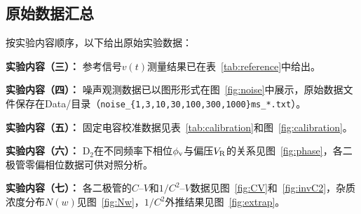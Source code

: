 \subsection{原始数据汇总}

按实验内容顺序，以下给出原始实验数据：

\textbf{实验内容（三）：} 参考信号$v(t)$测量结果已在表~\ref{tab:reference}中给出。

\textbf{实验内容（四）：} 噪声观测数据已以图形形式在图~\ref{fig:noise}中展示，原始数据文件保存在Data/目录（\texttt{noise\_\{1,3,10,30,100,300,1000\}ms\_*.txt}）。

\textbf{实验内容（五）：} 固定电容校准数据见表~\ref{tab:calibration}和图~\ref{fig:calibration}。

\textbf{实验内容（六）：} D$_2$在不同频率下相位$\phi_{\rm v}$与偏压$V_{\rm R}$的关系见图~\ref{fig:phase}，各二极管零偏相位数据可供对照分析。

\textbf{实验内容（七）：} 各二极管的$C$--$V$和$1/C^{2}$--$V$数据见图~\ref{fig:CV}和~\ref{fig:invC2}，杂质浓度分布$N(w)$见图~\ref{fig:Nw}，$1/C^{2}$外推结果见图~\ref{fig:extrap}。
